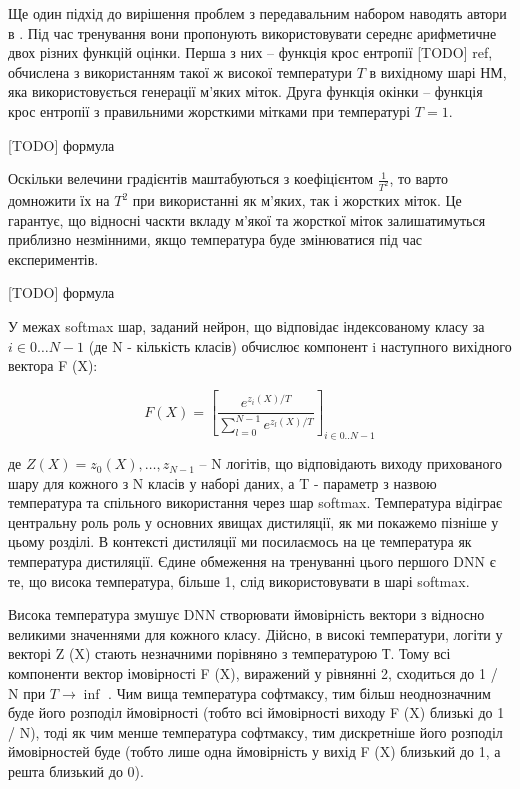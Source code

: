 \documentclass[14pt,a4paper]{extarticle}
\newcounter{e}
\numberwithin{equation}{section}
\numberwithin{figure}{section}
\begin{document}
 Ще один підхід до вирішення проблем з передавальним набором наводять автори в \cite{distillation}. Під час тренування вони пропонують використовувати середнє арифметичне двох різних функцій оцінки. Перша з них -- функція крос ентропії [TODO] ref, обчислена з використанням такої ж високої температури $T$ в вихідному шарі НМ, яка використовується генерації м'яких міток. Друга функція окінки -- функція крос ентропії з правильними жорсткими мітками при температурі $T=1$.
 
 [TODO] формула
 
 Оскільки велечини градієнтів маштабуються з коефіцієнтом $\frac{1}{T^2}$, то варто домножити їх на $T^2$ при використанні як м'яких, так і жорстких міток. Це гарантує, що відносні часкти вкладу м'якої та жорсткої міток залишатимуться приблизно незмінними, якщо температура буде змінюватися під час експериментів.
 
 [TODO] формула

 
 
 
 
 
 
 У межах
 softmax шар, заданий нейрон, що відповідає індексованому класу
 за $i \in 0 \dots N-1$ (де N - кількість класів) обчислює
 компонент i наступного вихідного вектора F (X):
 
 $$
 F(X)=\left[\frac{e^{z_{i}(X) / T}}{\sum_{l=0}^{N-1} e^{z_{l}(X) / T}}\right]_{i \in 0 . . N-1}
 $$
 
 де $Z(X) = z_0(X), \dots , z_{N-1}$ -- N логітів, що відповідають виходу прихованого шару для кожного з N класів
 у наборі даних, а T - параметр з назвою температура та
 спільного використання через шар softmax. Температура відіграє центральну роль
 роль у основних явищах дистиляції, як ми покажемо пізніше
 у цьому розділі. В контексті дистиляції ми посилаємось на це
 температура як температура дистиляції. Єдине обмеження
 на тренуванні цього першого DNN є те, що висока температура,
 більше 1, слід використовувати в шарі softmax.
 
 Висока температура змушує DNN створювати ймовірність
 вектори з відносно великими значеннями для кожного класу. Дійсно, в
 високі температури, логіти у векторі Z (X) стають незначними
 порівняно з температурою Т. Тому всі компоненти
 вектор імовірності F (X), виражений у рівнянні 2, сходиться до
 1 / N при $T \to \inf$ . Чим вища температура софтмаксу,
 тим більш неоднозначним буде його розподіл ймовірності (тобто всі
 ймовірності виходу F (X) близькі до 1 / N), тоді як
 чим менше температура софтмаксу, тим дискретніше
 його розподіл ймовірностей буде (тобто лише одна ймовірність у
 вихід F (X) близький до 1, а решта близький до 0).
 
\end{document}
